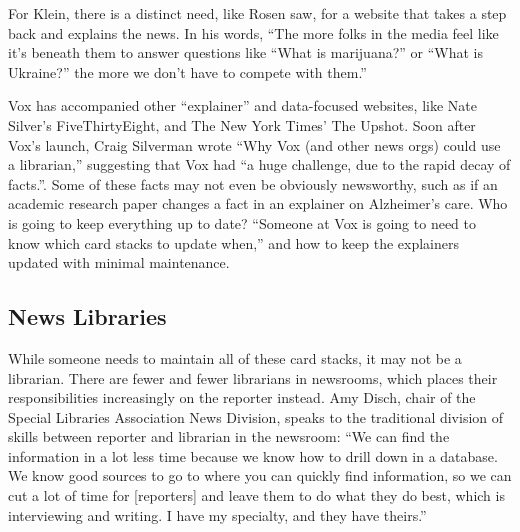 For Klein, there is a distinct need, like Rosen saw, for a website that takes a step back and explains the news. In his words, ``The more folks in the media feel like it's beneath them to answer questions like ``What is marijuana?'' or ``What is Ukraine?'' the more we don't have to compete with them.''

Vox has accompanied other ``explainer'' and data-focused websites, like Nate Silver's FiveThirtyEight, and The New York Times' The Upshot. Soon after Vox's launch, Craig Silverman wrote ``Why Vox (and other news orgs) could use a librarian,'' suggesting that Vox had ``a huge challenge, due to the rapid decay of facts.''.\autocite{}  Some of these facts may not even be obviously newsworthy, such as if an academic research paper changes a fact in an explainer on Alzheimer's care. Who is going to keep everything up to date? ``Someone at Vox is going to need to know which card stacks to update when,'' and how to keep the explainers updated with minimal maintenance.





\subsection{News Libraries}

While someone needs to maintain all of these card stacks, it may not be a librarian. There are fewer and fewer librarians in newsrooms, which places their responsibilities increasingly on the reporter instead. Amy Disch, chair of the Special Libraries Association News Division, speaks to the traditional division of skills between reporter and librarian in the newsroom: ``We can find the information in a lot less time because we know how to drill down in a database. We know good sources to go to where you can quickly find information, so we can cut a lot of time for [reporters] and leave them to do what they do best, which is interviewing and writing. I have my specialty, and they have theirs.''\autocite{}

